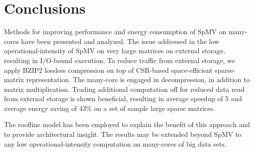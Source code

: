 \section{Conclusions}
\label{sec:conclusions}

Methods for improving performance and energy consumption of SpMV on many-cores have been presented and analyzed. The issue addressed in the low operational-intensity of SpMV on very large matrices on external storage, resulting in I/O-bound execution. To reduce traffic from external storage, we apply BZIP2 lossless compression on top of CSR-based space-efficient sparse-matrix representation. The many-core is engaged in decompression, in addition to matrix multiplication. Trading additional computation off for reduced data read from external storage is shown beneficial, resulting in average speedup of 5 and average energy saving of 43\% on a set of sample large sparse matrices. 

The roofline model has been employed to explain the benefit of this approach and to provide architectural insight. The results may be extended beyond SpMV to any low operational-intensity computation on many-cores of big data sets. 
